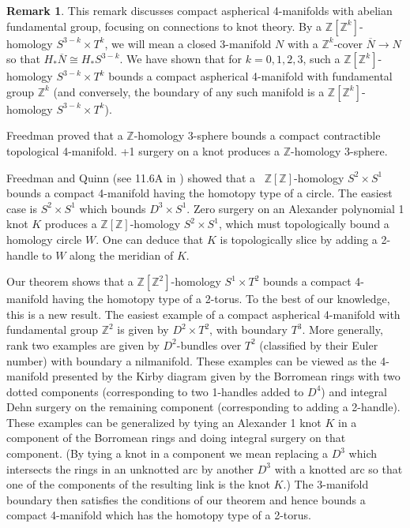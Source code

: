 \documentclass[12pt]{amsart}
\theoremstyle{definition}
\newtheorem{remark}[theorem]{Remark}
\newcommand{\Z}{\mathbb Z}
\newcommand{\ol}[1]{{\overline{#1}}}
\begin{document}
\begin{remark} \label{rem:aspherical examples}
This remark discusses compact aspherical 4-manifolds with abelian fundamental group, focusing on connections to knot theory.  
By a $\Z[\Z^k]$-homology $S^{3-k}\times{T^k}$, we will mean a closed 
3-manifold $N$ with a $\Z^k$-cover $\ol N \to N$ so that 
$H_*\ol N \cong H_*S^{3-k}$.    
We have shown that for $k = 0,1,2,3$, such a $\Z[\Z^k]$-homology 
$S^{3-k}\times{T^k}$ bounds a compact aspherical 4-manifold with fundamental group $\Z^k$ (and conversely, the boundary of any such manifold is a $\Z[\Z^k]$-homology $S^{3-k}\times{T^k}$).

Freedman \cite{Fr} proved that a  $\Z$-homology 3-sphere bounds a compact contractible topological 4-manifold.   +1 surgery on a knot produces   
a $\Z$-homology 3-sphere.

Freedman and Quinn (see 11.6A in \cite{FQ}) showed that a \ $\Z[\Z]$-homology $S^2\times{S^1}$ bounds a compact 4-manifold having the homotopy type of a circle.  The easiest case is $S^2 \times S^1$ which bounds $D^3 \times S^1$.     Zero surgery on an Alexander polynomial 1 knot $K$ produces a  $\Z[\Z]$-homology $S^2\times{S^1}$, which must topologically bound a homology circle $W$.   One can deduce that $K$ is topologically slice by adding a 2-handle to $W$ along the meridian of $K$.

Our theorem shows that a  $\Z[\Z^2]$-homology $S^1\times{T^2}$
bounds a  compact 4-manifold having the homotopy type of a 2-torus.   
To the best of our knowledge, this is a new result.   
The easiest example of a compact aspherical 4-manifold with fundamental group $\Z^2$  is given by $D^2 \times T^2$, with boundary $T^3$.  More generally, rank two examples are given by  $D^2$-bundles over $T^2$ (classified by their Euler number) with boundary a nilmanifold.    These examples can be viewed as the 4-manifold presented by the Kirby diagram given by the Borromean rings with two dotted components (corresponding to two 1-handles added to $D^4$) and  integral Dehn surgery on the remaining component (corresponding to adding a 2-handle).    These examples can be generalized by  tying an Alexander 1 knot $K$ in a component of the Borromean rings and doing integral surgery on that component.  (By tying a knot in a component we mean replacing a $D^3$ which intersects the rings in an unknotted arc by another $D^3$ with a knotted arc  so that one of the components of the resulting link is the knot $K$.)    The 3-manifold boundary then satisfies the conditions of our theorem and hence bounds a compact 4-manifold which has the homotopy type of a 2-torus.


\end{remark}
\end{document}
